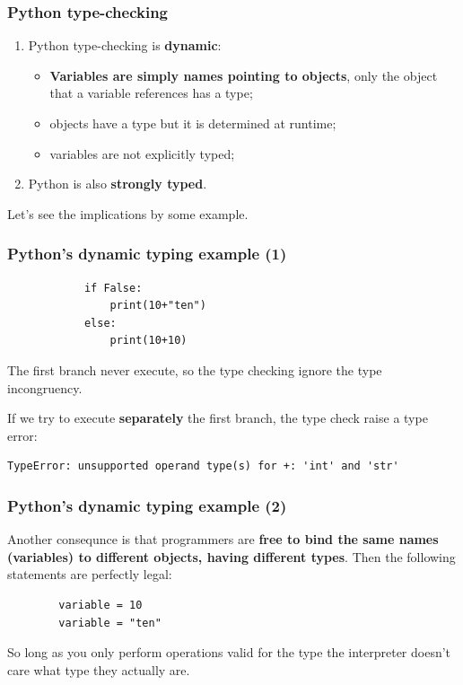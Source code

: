 \documentclass[xcolor ={table,usenames,dvipsnames}]{beamer}
\theoremstyle{definition}
\begin{document}
	\begin{frame}
		\frametitle{Python type-checking}
			\begin{enumerate}
				\item Python type-checking is \textbf{dynamic}: 
				\begin{itemize}
					\item \textbf{Variables are simply names pointing to objects}, only the object that a variable references has a type;
					\item objects have a type but it is determined at runtime;
					\item variables are not explicitly typed;
					
				\end{itemize}
				\item Python is also \textbf{strongly typed}.
			\end{enumerate}
			
			Let's see the implications by some example.
	\end{frame}

	\begin{frame}[fragile]
		\frametitle{Python's dynamic typing example (1)}
			\begin{lstlisting} 
			if False:
				print(10+"ten") 
			else:
				print(10+10)
			\end{lstlisting}
			The first branch never execute, so the type checking ignore the type incongruency.
			
			If we try to execute \textbf{separately} the first branch, the type check raise a type error:
			
			\begin{lstlisting}[keywordstyle=\color{black},
			commentstyle=\color{black},
			stringstyle=\color{black}.]
			TypeError: unsupported operand type(s) for +: 'int' and 'str'
			\end{lstlisting}
	\end{frame}

	\begin{frame}[fragile]
		\frametitle{Python's dynamic typing example (2)}
		Another consequnce is that programmers are \textbf{free to bind the same names (variables) to different objects, having  different types}. Then the following statements are perfectly legal:
		
		\begin{lstlisting}
		variable = 10
		variable = "ten"
		\end{lstlisting}
		
		So long as you only perform operations valid for the type the interpreter doesn't care what type they actually are. 
	\end{frame}
\end{document}
